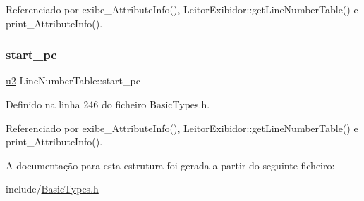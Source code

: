 Referenciado por exibe\+\_\+\+Attribute\+Info(), Leitor\+Exibidor\+::get\+Line\+Number\+Table() e print\+\_\+\+Attribute\+Info().

\mbox{\label{structLineNumberTable_a16496fea3c8c74d3a54f0104061f0df9}} 
\subsubsection{\texorpdfstring{start\+\_\+pc}{start\_pc}}
{\footnotesize\ttfamily \hyperlink{BasicTypes_8h_a732cde1300aafb73b0ea6c2558a7a54f}{u2} Line\+Number\+Table\+::start\+\_\+pc}



Definido na linha 246 do ficheiro Basic\+Types.\+h.



Referenciado por exibe\+\_\+\+Attribute\+Info(), Leitor\+Exibidor\+::get\+Line\+Number\+Table() e print\+\_\+\+Attribute\+Info().



A documentação para esta estrutura foi gerada a partir do seguinte ficheiro\+:\begin{DoxyCompactItemize}
\item 
include/\hyperlink{BasicTypes_8h}{Basic\+Types.\+h}\end{DoxyCompactItemize}
